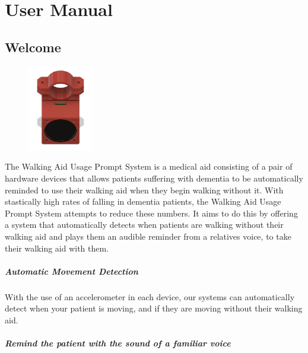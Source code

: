 \chapter{User Manual}
\label{ch:usermanual}

	\section{Welcome}
	\label{sec:welcome}

		\begin{figure}
			\vspace{-5em}
			\centering
			\includegraphics[width=0.25\textwidth]{graphics/final-cad.png}
		\end{figure}

		The Walking Aid Usage Prompt System is a medical aid consisting of a pair of hardware devices that allows patients suffering with dementia to be automatically reminded to use their walking aid when they begin walking without it. With stastically high rates of falling in dementia patients, the Walking Aid Usage Prompt System attempts to reduce these numbers. It aims to do this by offering a system that automatically detects when patients are walking without their walking aid and plays them an audible reminder from a relatives voice, to take their walking aid with them.

		\paragraph{Automatic Movement Detection}\mbox{}

		With the use of an accelerometer in each device, our systems can automatically detect when your patient is moving, and if they are moving without their walking aid.

		\paragraph{Remind the patient with the sound of a familiar voice}\mbox{}

